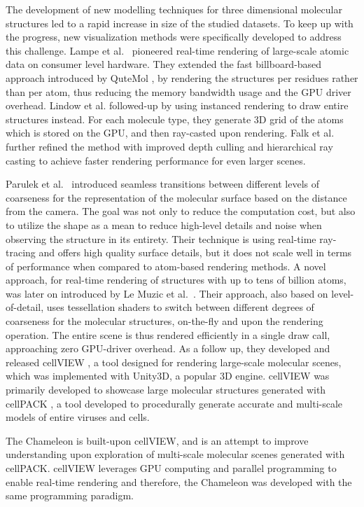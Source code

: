 \documentclass[review,journal]{vgtc}         %
\begin{document}
The development of new modelling techniques for three dimensional molecular structures led to a rapid increase in size of the studied datasets.
To keep up with the progress, new visualization methods were specifically developed to address this challenge.
Lampe et al.~\cite{lampe2007two} pioneered real-time rendering of large-scale atomic data on consumer level hardware. 
They extended the fast billboard-based approach introduced by QuteMol \cite{tarini2006ambient}, by rendering the structures per residues rather than per atom, thus reducing the memory bandwidth usage and the GPU driver overhead. 
Lindow et al. \cite{lindow2012interactive} followed-up by using  instanced rendering to draw entire structures instead.
For each molecule type, they generate 3D grid of the atoms which is stored on the GPU, and then ray-casted upon rendering.
Falk et al. \cite{falk2013atomistic} further refined the method with improved depth culling and hierarchical ray casting to achieve faster rendering performance for even larger scenes. 

Parulek et al.~\cite{parulek2014continuous} introduced seamless transitions between different levels of coarseness for the representation of the molecular surface based on the distance from the camera.
The goal was not only to reduce the computation cost, but also to utilize the shape as a mean to reduce high-level details and noise when observing the structure in its entirety.
Their technique is using real-time ray-tracing and offers high quality surface details, but it does not scale well in terms of performance when compared to atom-based rendering methods.
A novel approach, for real-time rendering of structures with up to tens of billion atoms, was later on introduced by Le Muzic et al.~\cite{le2014illustrative}. 
Their approach, also based on level-of-detail, uses tessellation shaders to switch between different degrees of coarseness for the molecular structures, on-the-fly and upon the rendering operation.
The entire scene is thus rendered efficiently in a single draw call, approaching zero GPU-driver overhead. 
As a follow up, they developed and released cellVIEW \cite{muzic2015cellview}, a tool designed for rendering large-scale molecular scenes, which was implemented with Unity3D, a popular 3D engine.
cellVIEW was primarily developed to showcase large molecular structures generated with cellPACK \cite{johnson2015cellpack}, a tool developed to procedurally generate accurate and multi-scale models of entire viruses and cells.

The Chameleon is built-upon cellVIEW, and is an attempt to improve understanding upon exploration of multi-scale molecular scenes generated with cellPACK.
cellVIEW leverages GPU computing and parallel programming to enable real-time rendering and therefore, the Chameleon was developed with the same programming paradigm.
\end{document}
